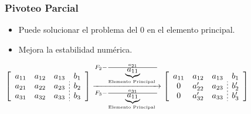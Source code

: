 \documentclass[xcolor=svgnames]{beamer} %
\theoremstyle{plain}
\theoremstyle{definition}
\begin{document}
\begin{frame}
\frametitle{Pivoteo Parcial}
\begin{itemize}
\item Puede solucionar el problema del 0 en el elemento principal.
\item Mejora la estabilidad numérica.
\end{itemize}

\pause
$ \left[\begin{array}{ccc;{2pt/2pt}c}
 a_{11} & a_{12} & a_{13}  &b_1\\
 a_{21} & a_{22} & a_{23} &b_2\\
 a_{31} & a_{32} & a_{33} &b_3
\end{array}\right] \xrightarrow[F_3 - \frac{a_{31}}{\underbrace{a_{11}}_{\text{Elemento Principal }} }]{F_2 - \frac{a_{21}}{\underbrace{a_{11}}_{\text{Elemento Principal }} } }   \left[\begin{array}{ccc;{2pt/2pt}c}
 a_{11} & a_{12} & a_{13}  &b_1\\
 0 & a_{22}' & a_{23} &b_2'\\
 0 & a_{32}' & a_{33} &b_3'
\end{array}\right] $ 
 

\end{frame}
\end{document}

